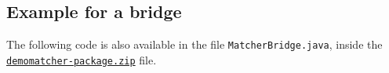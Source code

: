 \documentclass{article}
\def\file#1{\textcolor{grayy}{\texttt{#1}}}
\def\tool#1{\textsl{#1}}
\begin{document}
\begin{comment}
\subsection{Using additional resources}
\label{sec:resources}

Most matching systems require some additional resources to be available during execution in order to run properly. Examples are configuration files, lists of stopwords, dictionary files of Wordnet, and many other kind of resources. If such resources are required by a matching system, they have to be copied to the directories \file{conf} or \file{lib}. The SEALS platform will in the deployment phase of the tool copy the contents of these folders (recursively, if there are sub folders) into the working directory where the matching process will be executed later on. Note that the files that have to be stored in these folders can typically be found in the base folder of a matching system. There is no strict distinction between the two folders. However, we decided to distinguish between these two types of files, because in the next version of the platform it might be relevant.

In our case \tool{DemoMatcher} requires the file \file{threshold.txt} to be available in the directory \file{configuration/} relative to the working directory where \tool{DemoMatcher} is executed.\footnote{In most cases the settings or configuration file(s) will be placed directly in \file{conf}. We have used this example to illustrate that it is possible to use subdirectories if required.} For that reason we have placed it in the package of the matcher as shown in \S\ref{sec:structure}. Note that the complete contents of \file{conf} and \file{lib} are copied recursively into the directory where the matcher will finally be executed.
\end{comment}

\subsection{Example for a bridge}
\label{sec:bridge}

The following code is also available in the file \file{MatcherBridge.java}, inside the \href{http://oaei.ontologymatching.org/2011/tutorial/windows/demomatcher-package.zip}{\nolinkurl{demomatcher-package.zip}} file.
\end{document}
